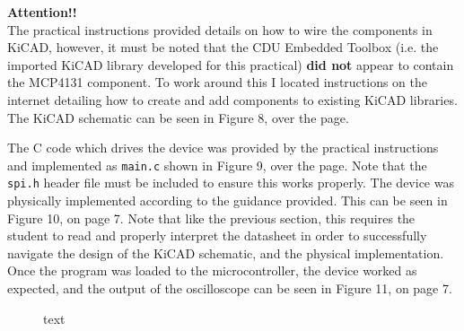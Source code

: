\documentclass[a4paper]{article}
\begin{document}
\begin{tcolorbox}
\textbf{Attention!!}\\

The practical instructions provided details on how to wire the components in KiCAD, however, it must be noted that the CDU Embedded Toolbox (i.e. the imported KiCAD library developed for this practical) \textbf{did not} appear to contain the MCP4131 component. To work around this I located instructions on the internet detailing how to create and add components to existing KiCAD libraries. The KiCAD schematic can be seen in Figure 8, over the page.
\end{tcolorbox}
\vspace{0.5cm}
The C code which drives the device was provided by the practical instructions and implemented as \verb|main.c| shown in Figure 9, over the page. Note that the \verb|spi.h| header file must be included to ensure this works properly. The device was physically implemented according to the guidance provided. This can be seen in Figure 10, on page 7. Note that like the previous section, this requires the student to read and properly interpret the datasheet in order to successfully navigate the design of the KiCAD schematic, and the physical implementation. Once the program was loaded to the microcontroller, the device worked as expected, and the output of the oscilloscope can be seen in Figure 11, on page 7.

\begin{figure}[h]
	\centering
	\caption{text}
\end{figure}
\end{document}
